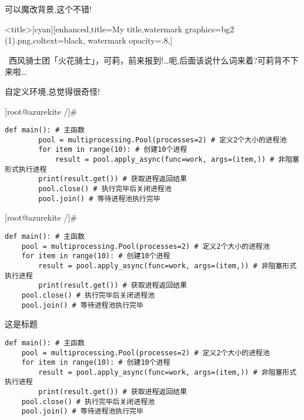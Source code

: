 可以魔改背景,这个不错!
\begin{ascolorbox5}[subtitle]{<title>}[cyan][enhanced,title=My title,watermark graphics=bg2
    (1).png,coltext=black,
    watermark opacity=.8,]
    \lipsum[2]
    \tcblower
    \begin{center}
    \end{center}
    \begin{center}{\textcolor[RGB]{255, 0,
                0}{\faHeart}~西风骑士团「火花骑士」，可莉，前来报到!…呃,后面该说什么词来着?可莉背不下来啦…~
            \textcolor[RGB]{255, 0, 0}{\faHeart}}
    \end{center}
\end{ascolorbox5}


自定义环境,总觉得很奇怪!
\begin{mycmd2}{[root@azurekite /]\#}
    \begin{lstlisting}[style=python2]
def main(): # 主函数
        pool = multiprocessing.Pool(processes=2) # 定义2个大小的进程池
        for item in range(10): # 创建10个进程
            result = pool.apply_async(func=work, args=(item,)) # 非阻塞形式执行进程
        print(result.get()) # 获取进程返回结果
        pool.close() # 执行完毕后关闭进程池
        pool.join() # 等待进程池执行完毕
    \end{lstlisting}
\end{mycmd2}

\begin{tcblisting}{}
\begin{mycmd2}{[root@azurekite /]\#}
\begin{lstlisting}[style=python2]
def main(): # 主函数
    pool = multiprocessing.Pool(processes=2) # 定义2个大小的进程池
    for item in range(10): # 创建10个进程
        result = pool.apply_async(func=work, args=(item,)) # 非阻塞形式执行进程
        print(result.get()) # 获取进程返回结果
    pool.close() # 执行完毕后关闭进程池
    pool.join() # 等待进程池执行完毕
\end{lstlisting}
\end{mycmd2}
\end{tcblisting}

\begin{macbox}{这是标题}
\begin{lstlisting}[style=python4]
def main(): # 主函数
    pool = multiprocessing.Pool(processes=2) # 定义2个大小的进程池
    for item in range(10): # 创建10个进程
        result = pool.apply_async(func=work, args=(item,)) # 非阻塞形式执行进程
        print(result.get()) # 获取进程返回结果
    pool.close() # 执行完毕后关闭进程池
    pool.join() # 等待进程池执行完毕
\end{lstlisting}
\end{macbox}


